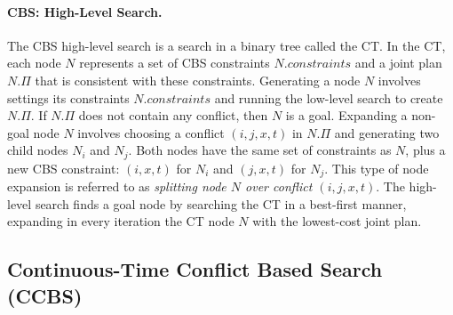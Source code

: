 \documentclass[letterpaper]{article} %
\newcommand{\cbs}{\ac{CBS}\xspace}
\newcommand{\ccbs}{\ac{CCBS}\xspace}
\newcommand{\ct}{\ac{CT}\xspace}
\newcommand{\mapfr}{{MAPF}$_R$\xspace}
\newcommand{\const}{\textit{constraints}\xspace}
\begin{document}
\paragraph{\cbs: High-Level Search.}
The \cbs high-level search is a search in a binary tree called the \ct.
In the \ct, each node $N$ represents a set of \cbs constraints $N.\const$
and a joint plan $N.\Pi$ that is consistent with these constraints.
Generating a node $N$ involves settings its constraints $N.\const$ and running the low-level search to create $N.\Pi$.
If $N.\Pi$ does not contain any conflict, then $N$ is a goal.
Expanding a non-goal node $N$ involves choosing a conflict $(i,j,x,t)$ in $N.\Pi$
and generating two child nodes $N_i$ and $N_j$.
Both nodes have the same set of constraints as $N$, plus a new \cbs constraint: $(i,x,t)$ for $N_i$ and $(j,x,t)$ for $N_j$.
This type of node expansion is referred to as \emph{splitting node $N$ over conflict $(i,j,x,t)$}.
The high-level search finds a goal node by searching the \ct in a best-first manner, expanding in every iteration the \ct node $N$ with the lowest-cost joint plan.



\subsection{Continuous-Time Conflict Based Search (CCBS)}


\end{document}
